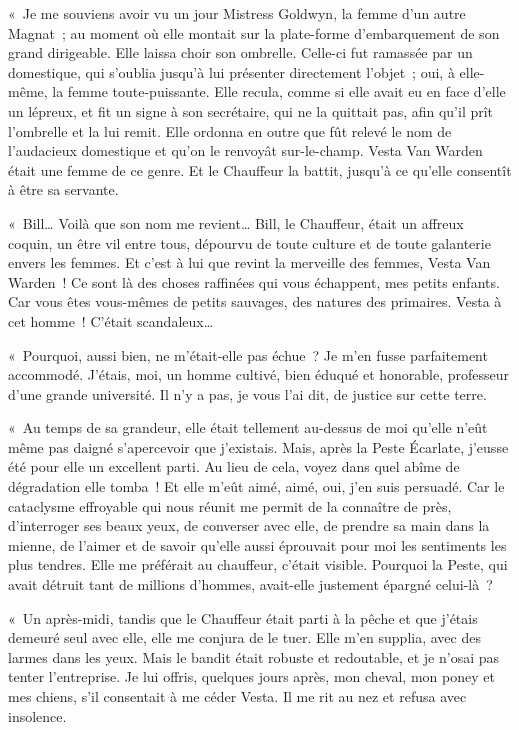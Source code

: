 \documentclass[french,twoside]{book} %
\begin{document}
« Je me souviens avoir vu un jour Mistress Goldwyn, la femme d’un autre Magnat ; au moment où elle montait sur la plate-forme d’embarquement de son grand dirigeable. Elle laissa choir son ombrelle. Celle-ci fut ramassée par un domestique, qui s’oublia jusqu’à lui présenter directement l’objet ; oui, à elle-même, la femme toute-puissante. Elle recula, comme si elle avait eu en face d’elle un lépreux, et fit un signe à son secrétaire, qui ne la quittait pas, afin qu’il prît l’ombrelle et la lui remit. Elle ordonna en outre que fût relevé le nom de l’audacieux domestique et qu’on le renvoyât sur-le-champ. Vesta Van Warden était une femme de ce genre. Et le Chauffeur la battit, jusqu’à ce qu’elle consentît à être sa servante.\par
« Bill… Voilà que son nom me revient… Bill, le Chauffeur, était un affreux coquin, un être vil entre tous, dépourvu de toute culture et de toute galanterie envers les femmes. Et c’est à lui que revint la merveille des femmes, Vesta Van Warden ! Ce sont là des choses raffinées qui vous échappent, mes petits enfants. Car vous êtes vous-mêmes de petits sauvages, des natures des primaires. Vesta à cet homme ! C’était scandaleux…\par
« Pourquoi, aussi bien, ne m’était-elle pas échue ? Je m’en fusse parfaitement accommodé. J’étais, moi, un homme cultivé, bien éduqué et honorable, professeur d’une grande université. Il n’y a pas, je vous l’ai dit, de justice sur cette terre.\par
« Au temps de sa grandeur, elle était tellement au-dessus de moi qu’elle n’eût même pas daigné s’apercevoir que j’existais. Mais, après la Peste Écarlate, j’eusse été pour elle un excellent parti. Au lieu de cela, voyez dans quel abîme de dégradation elle tomba ! Et elle m’eût aimé, aimé, oui, j’en suis persuadé. Car le cataclysme effroyable qui nous réunit me permit de la connaître de près, d’interroger ses beaux yeux, de converser avec elle, de prendre sa main dans la mienne, de l’aimer et de savoir qu’elle aussi éprouvait pour moi les sentiments les plus tendres. Elle me préférait au chauffeur, c’était visible. Pourquoi la Peste, qui avait détruit tant de millions d’hommes, avait-elle justement épargné celui-là ?\par
« Un après-midi, tandis que le Chauffeur était parti à la pêche et que j’étais demeuré seul avec elle, elle me conjura de le tuer. Elle m’en supplia, avec des larmes dans les yeux. Mais le bandit était robuste et redoutable, et je n’osai pas tenter l’entreprise. Je lui offris, quelques jours après, mon cheval, mon poney et mes chiens, s’il consentait à me céder Vesta. Il me rit au nez et refusa avec insolence.\par
\end{document}
